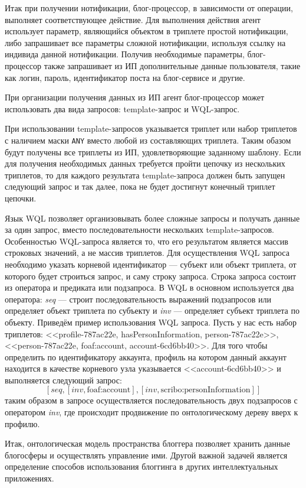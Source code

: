 Итак при получении нотификации, блог-процессор, в зависимости от операции, выполняет соответствующее действие. Для выполнения действия агент использует параметр, являющийся объектом в триплете простой нотификации, либо запрашивает все параметры сложной нотификации, используя ссылку на индивида данной нотификации. Получив необходимые параметры, блог-процессор также запрашивает из ИП дополнительные данные пользователя, такие как логин, пароль, идентификатор поста на блог-сервисе и другие.

При организации получения данных из ИП агент блог-процессор может использовать два вида запросов: template-запрос и WQL-запрос.

При использовании template-запросов указывается триплет или набор триплетов с наличием маски {\tt ANY} вместо любой из составляющих триплета. Таким обазом будут получены все триплеты из ИП, удовлетворяющие заданному шаблону. Если для получения необходимых данных требуется пройти цепочку из нескольких триплетов, то для каждого результата template-запроса должен быть запущен следующий запрос и так далее, пока не будет достигнут конечный триплет цепочки.

Язык WQL позволяет организовывать более сложные запросы и получать данные за один запрос, вместо последовательности нескольких template-запросов. Особенностью WQL-запроса является то, что его результатом является массив строковых значений, а не массив триплетов. Для осуществления WQL запроса необходимо указать корневой идентификатор --- субъект или объект триплета, от которого будет строиться запрос, и саму строку запроса. Строка запроса состоит из оператора и предиката или подзапроса. В WQL в основном используется два оператора: {\it seq} --- строит последовательность выражений подзапросов или определяет объект триплета по субъекту и {\it inv} --- определяет субъект триплета по объекту. Приведём пример использования WQL запроса. Пусть у нас есть набор триплетов: <<profile-787ac22e, hasPersonInformation, person-787ac22e>>, <<person-787ac22e, foaf:account, account-6cd6bb40>>. Для того чтобы определить по идентификатору аккаунта, профиль на котором данный аккаунт находится в качестве корневого узла указывается <<account-6cd6bb40>> и выполняется следующий запрос:
$$
[seq,[inv, \mbox{foaf:account}], [inv, \mbox{scribo:personInformation}]]
$$
таким образом в запросе осуществляется последовательность двух подзапросов с оператором {\it inv}, где происходит продвижение по онтологическому дереву вверх к профилю.

Итак, онтологическая модель пространства блоггера позволяет хранить данные блогосферы и осуществлять управление ими. Другой важной задачей является определение способов использования блоггинга в других интеллектуальных приложениях.
